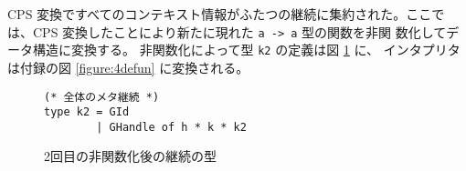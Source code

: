 CPS 変換ですべてのコンテキスト情報がふたつの継続に集約された。ここで
は、CPS 変換したことにより新たに現れた \texttt{a -> a} 型の関数を非関
数化してデータ構造に変換する。
非関数化によって型 \texttt{k2} の定義は図 \ref{figure:k2_4defun} に、
インタプリタは付録の図 \ref{figure:4defun} に変換される。

\begin{figure}[t]
\begin{spacing}{0.9}
\begin{verbatim}
(* 全体のメタ継続 *)
type k2 = GId
        | GHandle of h * k * k2
\end{verbatim}
\caption{2回目の非関数化後の継続の型}
\label{figure:k2_4defun}
\end{spacing}
\end{figure}

